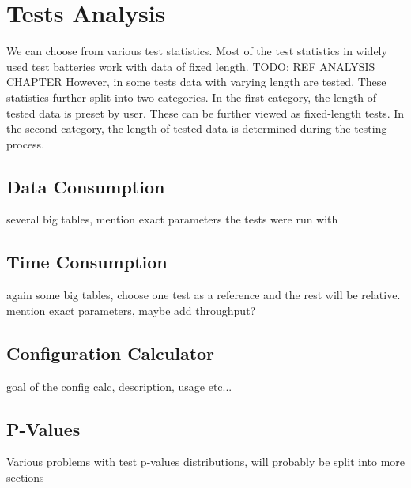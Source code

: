 \documentclass[
  digital,     %
  oneside,     %
  nosansbold,  %
  nocolorbold, %
  nolof,         %
  nolot,         %
]{fithesis4}
\begin{document}




\chapter{Tests Analysis} 
We can choose from various test statistics. Most of the test statistics in widely used test batteries work with data of fixed length. TODO: REF ANALYSIS CHAPTER However, in some tests data with varying length are tested. These statistics further split into two categories. In the first category, the length of tested data is preset by user. These can be further viewed as fixed-length tests. In the second category, the length of tested data is determined during the testing process.

\section{Data Consumption} \label{chap:analysis-data}
several big tables, mention exact parameters the tests  were run with

\section{Time Consumption} 
again some big tables, choose one test as a reference and the rest will be relative. mention exact parameters, maybe add throughput?
\section{Configuration Calculator}
goal of the config calc, description, usage etc...
\section{P-Values}
Various problems with test p-values distributions, will probably be split into more sections



\end{document}
